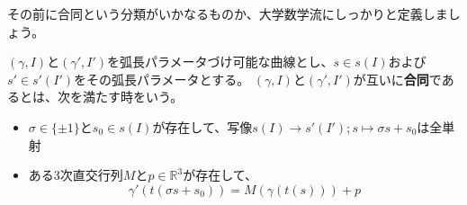 その前に合同という分類がいかなるものか、大学数学流にしっかりと定義しましょう。
\begin{definition}
  $(\gamma,I)$と$(\gamma',I')$を弧長パラメータづけ可能な曲線とし、$s\in s(I)$および$s'\in s'(I')$をその弧長パラメータとする。
  $(\gamma,I)$と$(\gamma',I')$が互いに\textbf{合同}であるとは、次を満たす時をいう。
  \begin{itemize}
    \item $\sigma\in\{\pm1\}$と$s_0\in s(I)$が存在して、写像$s(I)\to s'(I');s\mapsto \sigma s+s_0$は全単射
    \item ある3次直交行列$M$と$p\in\mathbb{R}^3$が存在して、
    \[
      \gamma'(t(\sigma s+s_0)) = M(\gamma(t(s))) + p
    \]
  \end{itemize}
\end{definition}

